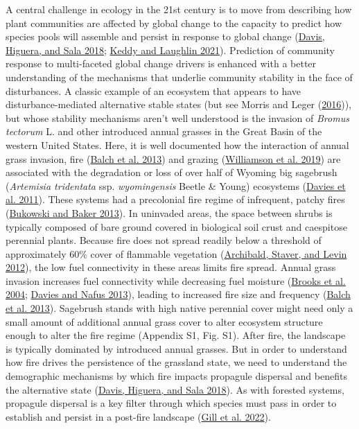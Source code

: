 \documentclass[
  12pt,
]{article}
\begin{document}
A central challenge in ecology in the 21st century is to move from
describing how plant communities are affected by global change to the
capacity to predict how species pools will assemble and persist in
response to global change (\protect\hyperlink{ref-Davis2018}{Davis,
Higuera, and Sala 2018}; \protect\hyperlink{ref-Keddy2021}{Keddy and
Laughlin 2021}). Prediction of community response to multi-faceted
global change drivers is enhanced with a better understanding of the
mechanisms that underlie community stability in the face of
disturbances. A classic example of an ecosystem that appears to have
disturbance-mediated alternative stable states (but see Morris and Leger
(\protect\hyperlink{ref-Morris2016}{2016})), but whose stability
mechanisms aren't well understood is the invasion of \emph{Bromus
tectorum} L. and other introduced annual grasses in the Great Basin of
the western United States. Here, it is well documented how the
interaction of annual grass invasion, fire
(\protect\hyperlink{ref-Balch2013}{Balch et al. 2013}) and grazing
(\protect\hyperlink{ref-Williamson2019}{Williamson et al. 2019}) are
associated with the degradation or loss of over half of Wyoming big
sagebrush (\emph{Artemisia tridentata} ssp. \emph{wyomingensis} Beetle
\& Young) ecosystems (\protect\hyperlink{ref-Davies2011}{Davies et al.
2011}). These systems had a precolonial fire regime of infrequent,
patchy fires (\protect\hyperlink{ref-Bukowski2013}{Bukowski and Baker
2013}). In uninvaded areas, the space between shrubs is typically
composed of bare ground covered in biological soil crust and caespitose
perennial plants. Because fire does not spread readily below a threshold
of approximately 60\% cover of flammable vegetation
(\protect\hyperlink{ref-Archibald2012}{Archibald, Staver, and Levin
2012}), the low fuel connectivity in these areas limits fire spread.
Annual grass invasion increases fuel connectivity while decreasing fuel
moisture (\protect\hyperlink{ref-Brooks2004}{Brooks et al. 2004};
\protect\hyperlink{ref-Davies2013}{Davies and Nafus 2013}), leading to
increased fire size and frequency
(\protect\hyperlink{ref-Balch2013}{Balch et al. 2013}). Sagebrush stands
with high native perennial cover might need only a small amount of
additional annual grass cover to alter ecosystem structure enough to
alter the fire regime (Appendix S1, Fig. S1). After fire, the landscape
is typically dominated by introduced annual grasses. But in order to
understand how fire drives the persistence of the grassland state, we
need to understand the demographic mechanisms by which fire impacts
propagule dispersal and benefits the alternative state
(\protect\hyperlink{ref-Davis2018}{Davis, Higuera, and Sala 2018}). As
with forested systems, propagule dispersal is a key filter through which
species must pass in order to establish and persist in a post-fire
landscape (\protect\hyperlink{ref-Gill2022}{Gill et al. 2022}).
\end{document}
